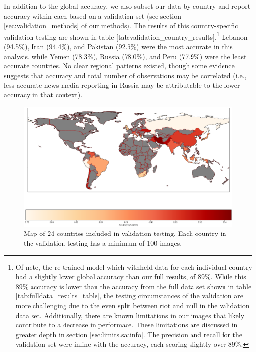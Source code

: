 In addition to the global accuracy, we also subset our data by country and report accuracy within each based on a validation set (see section \ref{sec:validation_methods} of our methods). The results of this country-specific validation testing are shown in table \ref{tab:validation_country_results}.\footnote{Of note, the re-trained model which withheld data for each individual country had a slightly lower global accuracy than our full results, of 89\%. While this 89\% accuracy is lower than the accuracy from the full data set shown in table \ref{tab:fulldata_results_table}, the testing circumstances of the validation are more challenging due to the even split between riot and null in the validation data set.  Additionally, there are known limitations in our images that likely contribute to a decrease in performace.  These limitations are discussed in greater depth in section \ref{sec:limits.satinfo}.  The precision and recall for the validation set were inline with the accuracy, each scoring slightly over 89\%.} Lebanon (94.5\%), Iran (94.4\%), and Pakistan (92.6\%) were the most accurate in this analysis, while Yemen (78.3\%), Russia (78.0\%), and Peru (77.9\%) were the least accurate countries.  No clear regional patterns existed, though some evidence suggests that accuracy and total number of observations may be correlated (i.e., less accurate news media reporting in Russia may be attributable to the lower accuracy in that context).

\begin{figure}
    \centering
    \includegraphics[width=0.75\linewidth]{Figures/global_accuracy_by_country.png}
    \caption{Map of 24 countries included in validation testing.  Each country in the validation testing has a minimum of 100 images.}
    \label{fig:global_map_validation}
\end{figure}


